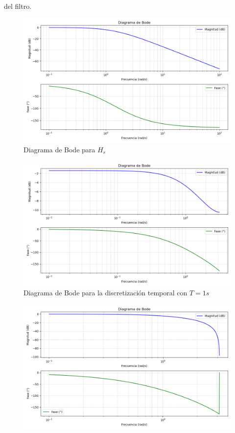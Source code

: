 \documentclass[a4paper,12pt]{report}
\begin{document}
\begin{enumerate}[label=\alph*), left=0pt]
                del filtro.\\
              \begin{figure}[H]
                \centering
                \includegraphics[width=1\linewidth]{./images/BodeHs.png}
                \caption{Diagrama de Bode para $H_s$}
              \end{figure}
              \begin{figure}[H]
                \centering
                \includegraphics[width=1\linewidth]{./images/BodeD1.png}
                \caption{Diagrama de Bode para la discretización temporal con $T=1s$}
              \end{figure}
              \begin{figure}[H]
                \centering
                \includegraphics[width=1\linewidth]{./images/BodeB1.png}

\end{figure}
\end{enumerate}
\end{document}
